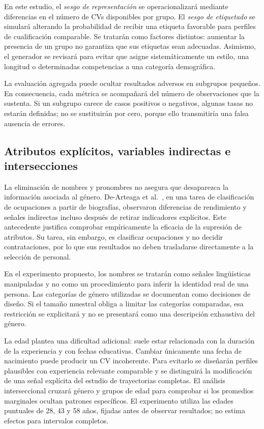 \documentclass[11pt,a4paper,oneside]{report}
\begin{document}
En este estudio, el \textit{sesgo de representación} se operacionalizará mediante diferencias en el número de CVs disponibles por grupo. El \textit{sesgo de etiquetado} se simulará alterando la probabilidad de recibir una etiqueta favorable para perfiles de cualificación comparable. Se tratarán como factores distintos: aumentar la presencia de un grupo no garantiza que sus etiquetas sean adecuadas. Asimismo, el generador se revisará para evitar que asigne sistemáticamente un estilo, una longitud o determinadas competencias a una categoría demográfica.

La evaluación agregada puede ocultar resultados adversos en subgrupos pequeños. En consecuencia, cada métrica se acompañará del número de observaciones que la sustenta. Si un subgrupo carece de casos positivos o negativos, algunas tasas no estarán definidas; no se sustituirán por cero, porque ello transmitiría una falsa ausencia de errores.

\subsection{Atributos explícitos, variables indirectas e intersecciones}

La eliminación de nombres y pronombres no asegura que desaparezca la información asociada al género. De-Arteaga et al.\ \cite{dearteaga2019}, en una tarea de clasificación de ocupaciones a partir de biografías, observaron diferencias de rendimiento y señales indirectas incluso después de retirar indicadores explícitos. Este antecedente justifica comprobar empíricamente la eficacia de la supresión de atributos. Su tarea, sin embargo, es clasificar ocupaciones y no decidir contrataciones, por lo que sus resultados no deben trasladarse directamente a la selección de personal.

En el experimento propuesto, los nombres se tratarán como señales lingüísticas manipuladas y no como un procedimiento para inferir la identidad real de una persona. Las categorías de género utilizadas se documentan como decisiones de diseño. Si el tamaño muestral obliga a limitar las categorías comparadas, esa restricción se explicitará y no se presentará como una descripción exhaustiva del género.

La edad plantea una dificultad adicional: suele estar relacionada con la duración de la experiencia y con fechas educativas. Cambiar únicamente una fecha de nacimiento puede producir un CV incoherente. Para evitarlo se diseñarán perfiles plausibles con experiencia relevante comparable y se distinguirá la modificación de una señal explícita del estudio de trayectorias completas. El análisis interseccional cruzará género y grupos de edad para comprobar si los promedios marginales ocultan patrones específicos. El experimento utiliza las edades puntuales de 28, 43 y 58 años, fijadas antes de observar resultados; no estima efectos para intervalos completos.
\end{document}
